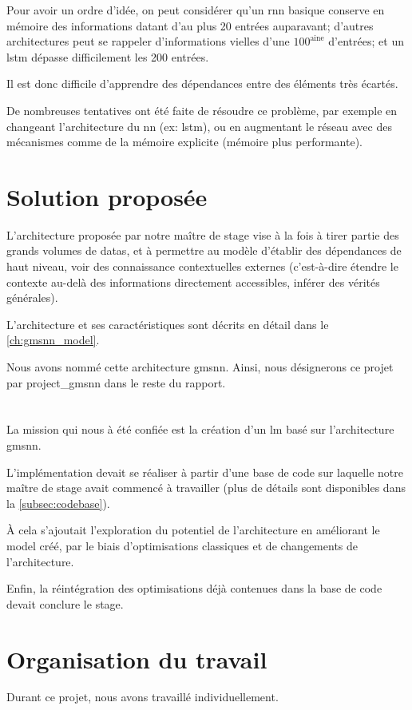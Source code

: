 Pour avoir un ordre d'idée, on peut considérer qu'un \gls{rnn} basique conserve en mémoire des informations datant d'au plus 20 entrées auparavant; d'autres architectures peut se rappeler d'informations vielles d'une $100^\text{aine}$ d'entrées; et un \gls{lstm} dépasse difficilement les 200 entrées.

Il est donc difficile d'apprendre des dépendances entre des éléments très écartés.

De nombreuses tentatives ont été faite de résoudre ce problème, par exemple en changeant l'architecture du \gls{nn} (ex: \gls{lstm}), ou en augmentant le réseau avec des mécanismes comme de la mémoire explicite (mémoire plus performante).

\section{Solution proposée}
L'architecture proposée par notre maître de stage vise à la fois à tirer partie des grands volumes de \glspl{data}, et à permettre au modèle d'établir des dépendances de haut niveau, voir des connaissance contextuelles externes (c'est-à-dire étendre le contexte au-delà des informations directement accessibles, inférer des vérités générales).

L'architecture et ses caractéristiques sont décrits en détail dans le \autoref{ch:gmsnn_model}.

Nous avons nommé cette architecture \gls{gmsnn}.
Ainsi, nous désignerons ce projet par \og \gls{project_gmsnn}\fg{} dans le reste du rapport.

\section{}
La mission qui nous à été confiée est la création d'un \gls{lm} basé sur l'architecture \gls{gmsnn}.

L'implémentation devait se réaliser à partir d'une base de code sur laquelle notre maître de stage avait commencé à travailler (plus de détails sont disponibles dans la \autoref{subsec:codebase}).

À cela s'ajoutait l'exploration du potentiel de l'architecture en améliorant le \gls{model} créé, par le biais d'optimisations classiques et de changements de l'architecture.

Enfin, la réintégration des optimisations déjà contenues dans la base de code devait conclure le stage.

\section{Organisation du travail}
Durant ce projet, nous avons travaillé individuellement.

